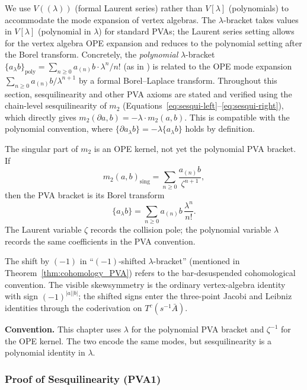 \begin{remark}
We use $V((\lambda))$ (formal Laurent series) rather than $V[\lambda]$ (polynomials) to accommodate the mode expansion of vertex algebras. The $\lambda$-bracket takes values in $V[\lambda]$ (polynomial in $\lambda$) for standard PVAs; the Laurent series setting allows for the vertex algebra OPE expansion and reduces to the polynomial setting after the Borel transform. Concretely, the \emph{polynomial} $\lambda$-bracket $\{a_\lambda b\}_{\mathrm{poly}} = \sum_{n \geq 0} a_{(n)} b \cdot \lambda^n / n!$ (as in \cite{Kac98}) is related to the OPE mode expansion $\sum_{n \geq 0} a_{(n)} b / \lambda^{n+1}$ by a formal Borel--Laplace transform. Throughout this section, sesquilinearity and other PVA axioms are stated and verified using the chain-level sesquilinearity of $m_2$ (Equations~\eqref{eq:sesqui-left}--\eqref{eq:sesqui-right}), which directly gives $m_2(\partial a, b) = -\lambda \cdot m_2(a,b)$. This is compatible with the polynomial convention, where $\{\partial a_\lambda b\} = -\lambda \{a_\lambda b\}$ holds by definition.
\end{remark}

\begin{remark}[Connection to $m_2$]
The singular part of \(m_2\) is an OPE kernel, not yet the polynomial
PVA bracket. If
\[
m_2(a,b)_{\mathrm{sing}}
=\sum_{n\ge0}\frac{a_{(n)}b}{\zeta^{n+1}},
\]
then the PVA bracket is its Borel transform
\[
\{a_\lambda b\}
=\sum_{n\ge0}a_{(n)}b\,\frac{\lambda^n}{n!}.
\]
The Laurent variable \(\zeta\) records the collision pole; the
polynomial variable \(\lambda\) records the same coefficients in the
PVA convention.

The shift by $(-1)$ in ``$(-1)$-shifted $\lambda$-bracket''
(mentioned in Theorem~\ref{thm:cohomology_PVA}) refers to the
bar-desuspended cohomological convention. The visible skewsymmetry is
the ordinary vertex-algebra identity with sign $(-1)^{|a||b|}$; the
shifted signs enter the three-point Jacobi and Leibniz identities
through the coderivation on $T^c(s^{-1}\bar A)$.

\textbf{Convention.}
This chapter uses \(\lambda\) for the polynomial PVA bracket and
\(\zeta^{-1}\) for the OPE kernel. The two encode the same modes, but
sesquilinearity is a polynomial identity in \(\lambda\).
\end{remark}

\subsubsection{Proof of Sesquilinearity (PVA1)}

